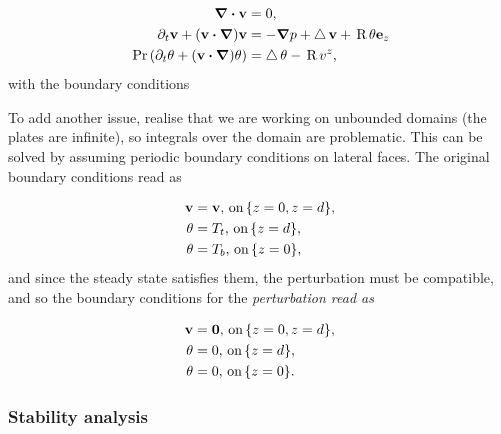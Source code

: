 \documentclass[../main.tex]{subfiles}
\begin{document}
\begin{tcolorbox}
\begin{align}
	\label{eq:equations_perturb}
	\divergence{\vb{v}}&= 0, \\
	\partial_t \vb{v}+ \qty(\vb{v} \vdot \grad)\vb{v} &= - \grad p + \laplace \vb{v} + \, \text{R} \, \theta \vb{e}_z \\
	\, \text{Pr} \,\qty(\partial_t \theta + \qty(\vb{v} \vdot \grad)\theta) & = \laplace \theta - \, \text{R} \,v^z,
\end{align}
with the boundary conditions
\end{tcolorbox}
To add another issue, realise that we are working on unbounded domains (the plates are infinite), so integrals over the domain are problematic. This can be solved by assuming periodic boundary conditions on lateral faces. The original boundary conditions read as

\begin{align*}
	\vb{v} &= \vb{v}, \, \text{on} \, \qty{z = 0, z = d},\\
	\theta &= T_t, \, \text{on} \, \qty{z=d}, \\
	\theta &= T_b, \, \text{on} \, \qty{z=0},
\end{align*}
and since the steady state satisfies them, the perturbation must be compatible, and so the boundary conditions for the \textit{perturbation read as}

\begin{tcolorbox}
\begin{align}
\label{eq:boundary_conds}
\vb{v} &= \vb{0}, \, \text{on} \, \qty{z = 0, z = d},\\
	\theta &= 0, \, \text{on} \, \qty{z=d}, \\
	\theta &= 0, \, \text{on} \, \qty{z=0}.
\end{align}
\end{tcolorbox}

\subsubsection{Stability analysis}
\label{sec:stab_anal}
\end{document}
